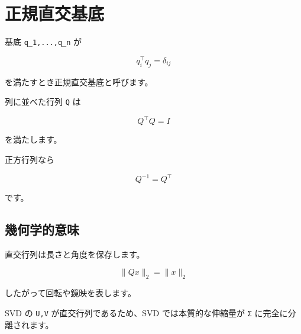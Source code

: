 \documentclass[
  11pt,
  a4paper,
]{ltjsarticle}
\author{}
\date{}
\begin{document}
\hypertarget{ux6b63ux898fux76f4ux4ea4ux57faux5e95}{%
\section{正規直交基底}\label{ux6b63ux898fux76f4ux4ea4ux57faux5e95}}

基底 \texttt{q\_1,...,q\_n} が

\[
q_i^\top q_j=\delta_{ij}
\]

を満たすとき正規直交基底と呼びます。

列に並べた行列 \texttt{Q} は

\[
Q^\top Q=I
\]

を満たします。

正方行列なら

\[
Q^{-1}=Q^\top
\]

です。

\hypertarget{ux5e7eux4f55ux5b66ux7684ux610fux5473}{%
\subsection{幾何学的意味}\label{ux5e7eux4f55ux5b66ux7684ux610fux5473}}

直交行列は長さと角度を保存します。

\[
\|Qx\|_2=\|x\|_2
\]

したがって回転や鏡映を表します。

SVD の \texttt{U,V} が直交行列であるため、SVD では本質的な伸縮量が
\texttt{Σ} に完全に分離されます。
\end{document}
